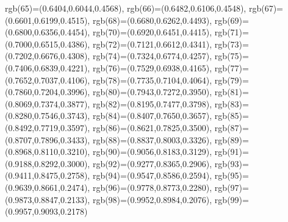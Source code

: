 {{        rgb(65)=(0.6404,0.6044,0.4568),
        rgb(66)=(0.6482,0.6106,0.4548),
        rgb(67)=(0.6601,0.6199,0.4515),
        rgb(68)=(0.6680,0.6262,0.4493),
        rgb(69)=(0.6800,0.6356,0.4454),
        rgb(70)=(0.6920,0.6451,0.4415),
        rgb(71)=(0.7000,0.6515,0.4386),
        rgb(72)=(0.7121,0.6612,0.4341),
        rgb(73)=(0.7202,0.6676,0.4308),
        rgb(74)=(0.7324,0.6774,0.4257),
        rgb(75)=(0.7406,0.6839,0.4221),
        rgb(76)=(0.7529,0.6938,0.4165),
        rgb(77)=(0.7652,0.7037,0.4106),
        rgb(78)=(0.7735,0.7104,0.4064),
        rgb(79)=(0.7860,0.7204,0.3996),
        rgb(80)=(0.7943,0.7272,0.3950),
        rgb(81)=(0.8069,0.7374,0.3877),
        rgb(82)=(0.8195,0.7477,0.3798),
        rgb(83)=(0.8280,0.7546,0.3743),
        rgb(84)=(0.8407,0.7650,0.3657),
        rgb(85)=(0.8492,0.7719,0.3597),
        rgb(86)=(0.8621,0.7825,0.3500),
        rgb(87)=(0.8707,0.7896,0.3433),
        rgb(88)=(0.8837,0.8003,0.3326),
        rgb(89)=(0.8968,0.8110,0.3210),
        rgb(90)=(0.9056,0.8183,0.3129),
        rgb(91)=(0.9188,0.8292,0.3000),
        rgb(92)=(0.9277,0.8365,0.2906),
        rgb(93)=(0.9411,0.8475,0.2758),
        rgb(94)=(0.9547,0.8586,0.2594),
        rgb(95)=(0.9639,0.8661,0.2474),
        rgb(96)=(0.9778,0.8773,0.2280),
        rgb(97)=(0.9873,0.8847,0.2133),
        rgb(98)=(0.9952,0.8984,0.2076),
        rgb(99)=(0.9957,0.9093,0.2178)
    }
}
